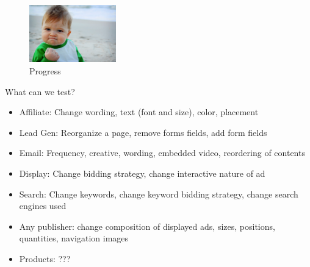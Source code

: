\documentclass[]{beamer}
\theoremstyle{definition}
\begin{document}
\begin{frame}
	\begin{figure}[ht!] 
		\centering
		\pause
	\end{figure}

	\begin{figure}
	\centering
		\caption{Progress}
		\includegraphics[height=2.5cm]{resources/victory_baby.png}
	\end{figure}
\end{frame}


\begin{frame}
	What can we test?\pause
	\begin{itemize}
		\item<2, 9> Affiliate: Change wording, text (font and size), color, placement
		\item<3, 9> Lead Gen: Reorganize a page, remove forms fields, add form fields
		\item<4, 9> Email: Frequency, creative, wording, embedded video, reordering of contents
		\item<5, 9> Display: Change bidding strategy, change interactive nature of ad
		\item<6, 9> Search: Change keywords, change keyword bidding strategy, change search engines used
		\item<7, 9> Any publisher: change composition of displayed ads, sizes, positions, quantities, navigation images
		\item<8, 9> Products: ???
	\end{itemize}
\end{frame}
\end{document}
